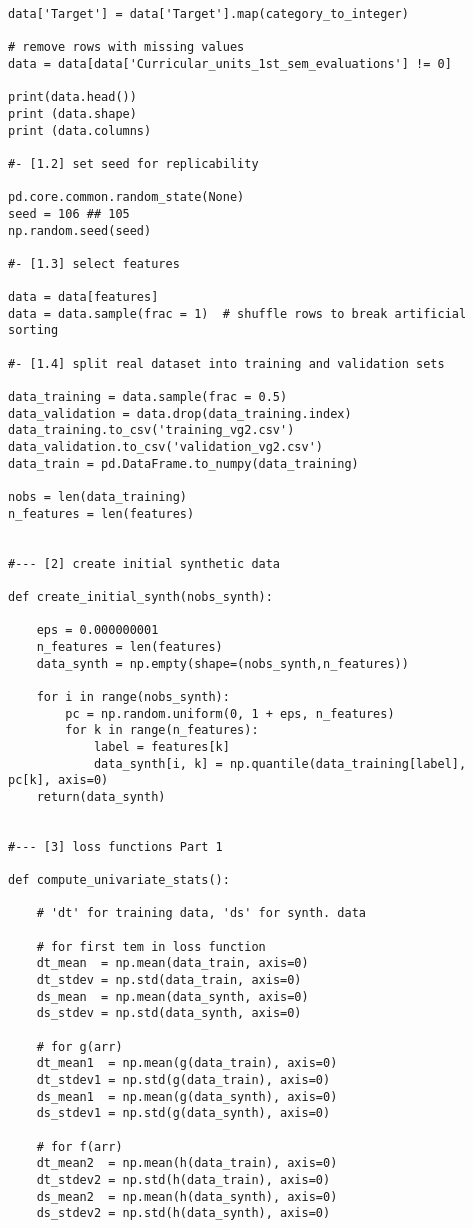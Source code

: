 \documentclass[oneside,10pt]{book}
\begin{document}
\begin{lstlisting}
data['Target'] = data['Target'].map(category_to_integer)

# remove rows with missing values
data = data[data['Curricular_units_1st_sem_evaluations'] != 0]

print(data.head())
print (data.shape)
print (data.columns)

#- [1.2] set seed for replicability

pd.core.common.random_state(None)
seed = 106 ## 105
np.random.seed(seed)

#- [1.3] select features

data = data[features]
data = data.sample(frac = 1)  # shuffle rows to break artificial sorting

#- [1.4] split real dataset into training and validation sets

data_training = data.sample(frac = 0.5)
data_validation = data.drop(data_training.index)
data_training.to_csv('training_vg2.csv')
data_validation.to_csv('validation_vg2.csv')
data_train = pd.DataFrame.to_numpy(data_training)

nobs = len(data_training)
n_features = len(features)


#--- [2] create initial synthetic data

def create_initial_synth(nobs_synth):

    eps = 0.000000001
    n_features = len(features)
    data_synth = np.empty(shape=(nobs_synth,n_features))

    for i in range(nobs_synth):
        pc = np.random.uniform(0, 1 + eps, n_features)
        for k in range(n_features):
            label = features[k]
            data_synth[i, k] = np.quantile(data_training[label], pc[k], axis=0)
    return(data_synth)


#--- [3] loss functions Part 1

def compute_univariate_stats():

    # 'dt' for training data, 'ds' for synth. data

    # for first tem in loss function
    dt_mean  = np.mean(data_train, axis=0)
    dt_stdev = np.std(data_train, axis=0)
    ds_mean  = np.mean(data_synth, axis=0)
    ds_stdev = np.std(data_synth, axis=0)

    # for g(arr)
    dt_mean1  = np.mean(g(data_train), axis=0)
    dt_stdev1 = np.std(g(data_train), axis=0)
    ds_mean1  = np.mean(g(data_synth), axis=0)
    ds_stdev1 = np.std(g(data_synth), axis=0)

    # for f(arr)
    dt_mean2  = np.mean(h(data_train), axis=0)
    dt_stdev2 = np.std(h(data_train), axis=0)
    ds_mean2  = np.mean(h(data_synth), axis=0)
    ds_stdev2 = np.std(h(data_synth), axis=0)


\end{lstlisting}
\end{document}
